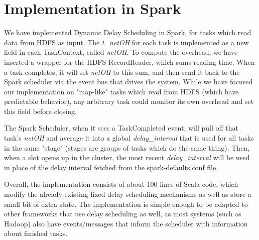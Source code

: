\section{Implementation in Spark}\label{sec:impl}

We have implemented Dynamic Delay Scheduling in Spark, for tasks which read data from 
HDFS as input. The \textit{t\_netOH} for each task is implemented as a new field in 
each TaskContext, called \textit{netOH}. To compute the overhead, we have inserted a 
wrapper for the HDFS RecordReader, which sums reading time. When a task completes, it 
will set \textit{netOH} to this sum, and then send it back to the Spark scheduler via the 
event bus that drives the system. While we have focused our implementation on "map-like" 
tasks which read from HDFS (which have predictable behavior), any arbitrary task could 
monitor its own overhead and set this field before closing.

The Spark Scheduler, when it sees a TaskCompleted event, will pull off that task's 
\textit{netOH} and average it into a global \textit{delay\_interval} that is used for all 
tasks in the same "stage" (stages are groups of tasks which do the same thing). Then, 
when a slot opens up in the cluster, the most recent \textit{delay\_interval} will be 
used in place of the delay interval fetched from the spark-defaults.conf file. 

Overall, the implementation consists of about 100 lines of Scala code, which modify
the already-existing fixed delay scheduling mechanisms as well as store a small
bit of extra state. The implementation is simple enough to be adapted to other frameworks
that use delay scheduling as well, as most systems (such as Hadoop) also have events/messages
that inform the scheduler with information about finished tasks.

